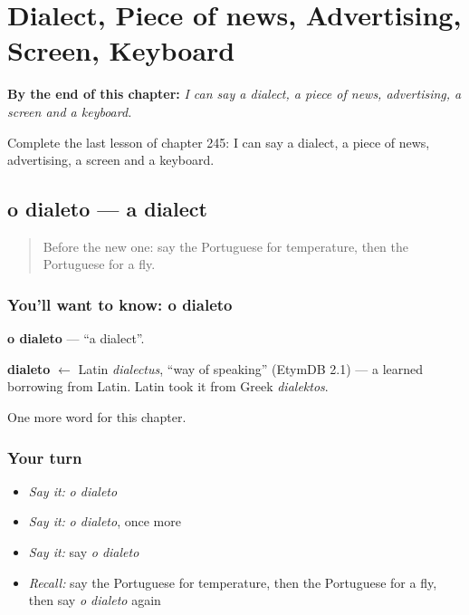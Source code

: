 
\chapter{Dialect, Piece of news, Advertising, Screen, Keyboard}
\label{ch:pt-dialect-piece-of-news-advertising-screen-keyboard}

\begin{chapteropening}
\textbf{By the end of this chapter:} \emph{I can say a dialect, a piece of news, advertising, a screen and a keyboard.}

Complete the last lesson of chapter 245: I can say a dialect, a piece of news, advertising, a screen and a keyboard.
\end{chapteropening}

\section[o dialeto]{o dialeto — a dialect}

\label{lesson:PT-C245-dialeto}



\begin{quote}
Before the new one: say the Portuguese for temperature, then the Portuguese for a fly.
\end{quote}

\subsection*{You'll want to know: o dialeto}
\textbf{o dialeto} — \textquotedblleft{}a dialect\textquotedblright{}.

\begin{cousinweb}
\textbf{dialeto} $\leftarrow$ Latin \emph{dialectus}, \textquotedblleft{}way of speaking\textquotedblright{} (EtymDB 2.1) — a learned borrowing from Latin. Latin took it from Greek \emph{dialektos}.
\end{cousinweb}

\begin{grammarlens}[title={What you've built}]
One more word for this chapter.
\end{grammarlens}

\subsection*{Your turn}
\begin{itemize}
\raggedright
  \item \emph{Say it:} \emph{o dialeto}
  \item \emph{Say it:} \emph{o dialeto}, once more
  \item \emph{Say it:} say \emph{o dialeto}
  \item \emph{Recall:} say the Portuguese for temperature, then the Portuguese for a fly, then say \emph{o dialeto} again
\end{itemize}

